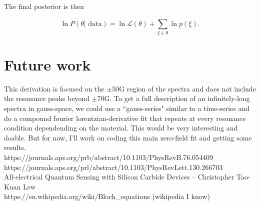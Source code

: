 \documentclass[svgnames]{article}
\begin{document}
The final posterior is then 

\[
    \ln P(\theta | \text{ data} ) = \ln \mathcal{L}(\theta) + \sum_{\xi \in
    \theta}^{} \ln p(\xi).  
\] \vspace{3px}

\section{Future work}

This derivation is focused on the $\pm 50$G region of the spectra and does not
include the resonance peaks beyond  $\pm 70$G. To get a full description of an
infinitely-long spectra in gauss-space, we could use a ``gauss-series" similar
to a time-series and do a compound fourier lorentzian-derivative fit that
repeats at every resonance condition dependending on the material. This would be
very interesting and doable. But for now, I'll work on coding this main
zero-field fit and getting some results.\\ 



https://journals.aps.org/prb/abstract/10.1103/PhysRevB.76.054409 \\
https://journals.aps.org/prl/abstract/10.1103/PhysRevLett.130.266703 \\ 
All-electrical Quantum Sensing with Silicon Carbide Devices -- Christopher
Tao-Kuan Lew \\
https://en.wikipedia.org/wiki/Bloch\_equations (wikipedia I know) \\ 
\end{document}
